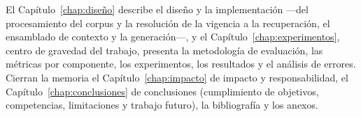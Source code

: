 El Capítulo~\ref{chap:diseño} describe el diseño y la implementación —del procesamiento del corpus y la resolución de la vigencia a la recuperación, el ensamblado de contexto y la generación—, y el Capítulo~\ref{chap:experimentos}, centro de gravedad del trabajo, presenta la metodología de evaluación, las métricas por componente, los experimentos, los resultados y el análisis de errores. Cierran la memoria el Capítulo~\ref{chap:impacto} de impacto y responsabilidad, el Capítulo~\ref{chap:conclusiones} de conclusiones (cumplimiento de objetivos, competencias, limitaciones y trabajo futuro), la bibliografía y los anexos.
 